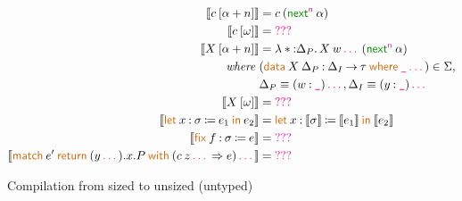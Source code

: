 \documentclass{article}
\newcommand{\meta}[1]{\mathsf{\textcolor{metacolour}{#1}}}
\newcommand{\constr}[1]{\mathsf{\textcolor{constrcolour}{#1}}}
\newcommand{\kw}[1]{\mathsf{\textcolor{kwcolour}{#1}}}
\newcommand{\kwopen}[1]{\kw{#1}\:}
\newcommand{\kwbin}[1]{\:\kw{#1}\:}
\newcommand{\arr}[2]{#1 \mathbin{\rightarrow} #2}
\newcommand{\lam}[3]{\lambda #1 \mathbin{:} #2 \mathpunct{.} #3}
\newcommand{\app}[2]{#1 \: #2}
\newcommand{\App}[2]{#1 \: \mathopen{[} #2 \mathclose{]}}
\newcommand{\letin}[4]{\kwopen{let} \mathopen{} #1 \mathbin{:} #2 \mathbin{\coloneqq} #3 \kwbin{in} #4}
\newcommand{\match}[3]{\kwopen{match} #1 \kwbin{return} #2 \kwbin{with} #3}
\newcommand{\fix}[3]{\kwopen{fix} #1 \mathbin{:} #2 \mathbin{\coloneqq} #3}
\newcommand{\data}[3]{\kwopen{data} #1 \mathbin{:} #2 \kwbin{where} #3}
\newcommand{\annot}[2]{#1 \mathbin{:} #2}
\newcommand{\next}{\constr{next}}
\newcommand{\seq}{\,\meta{\dots}\,}
\newcommand{\any}{\meta{\texttt{\_}}}
\newcommand{\compile}[1]{\mathopen{\llbracket} #1 \mathclose{\rrbracket}}
\newcommand{\huh}{\meta{???}}
\begin{document}
\begin{figure}[h]
\begin{align*}
        \compile{\App{c}{\alpha + n}} &= \app{c}{(\app{\next^\meta{n}}{\alpha})} \\
        \compile{\App{c}{\omega}} &= \huh \\
        \compile{\App{X}{\alpha + n}} &= \lam*{\Delta_P}{\app{\app{X}{w \seq}}{(\app{\next^\meta{n}}{\alpha})}} \\
        \textit{where} ~ &(\data{\app{X}{\Delta_P}}{\arr{\Delta_I}{\tau}}{\any \seq}) \in \Sigma, \\
        &\Delta_P \equiv (\annot{w}{\any}) \seq, \Delta_I \equiv (\annot{y}{\any}) \seq \\
        \compile{\App{X}{\omega}} &= \huh \\
        \compile{\letin{x}{\sigma}{e_1}{e_2}} &= \letin{x}{\compile{\sigma}}{\compile{e_1}}{\compile{e_2}} \\
        \compile{\fix{f}{\sigma}{e}} &= \huh \\
        \compile{\match{e'}{(y \seq).x.P}{(\app{c}{z \seq} \Rightarrow e) \seq}} &= \huh
    \end{align*}
    \caption{Compilation from sized to unsized (untyped)}
    \label{fig:compilation-untyped}
\end{figure}
\fi
\end{document}
